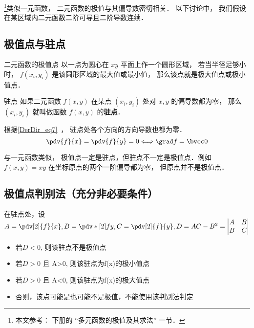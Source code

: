 

\footnote{本文参考： \cite{同济高} 下册的 “多元函数的极值及其求法” 一节．}类似一元函数， 二元函数的极值与其偏导数密切相关． 以下讨论中， 我们假设在某区域内二元函数二阶可导且二阶导数连续．

\subsection{极值点与驻点}
\begin{definition}{二元函数的极值点}
以一点为圆心在 $xy$ 平面上作一个圆形区域， 若当半径足够小时， $f(x_i, y_i)$ 是该圆形区域的最大值或最小值， 那么该点就是极大值点或极小值点． 
\end{definition}

\begin{definition}{驻点}
如果二元函数 $f(x,y)$ 在某点 $(x_i, y_i)$ 处对 $x, y$ 的偏导数都为零， 那么 $(x_i, y_i)$ 就叫做函数 $f(x,y)$ 的\textbf{驻点}． 
\end{definition}
根据\autoref{DerDir_eq7}~， 驻点处各个方向的方向导数也都为零．
\begin{equation}
\pdv{f}{x}=\pdv{f}{y}=0 \Longleftrightarrow \grad f=\bvec0
\end{equation}

与一元函数类似， 极值点一定是驻点，但驻点不一定是极值点．例如 $f(x,y) = xy$ 在坐标原点的两个一阶偏导都为零， 但原点并不是极值点． 
\subsection{极值点判别法（充分非必要条件）}
在驻点处，设$A=\pdv[2]{f}{x}, B=\pdv*[2]{f}{y}, C=\pdv[2]{f}{y}, D=AC-B^2=
\left | \begin{matrix}
A&B\\
B&C\\
\end{matrix} \right | $ 

\begin{itemize}
\item 若$D<0$, 则该驻点不是极值点
\item 若$D>0$ 且 A>0, 则该驻点为f(x)的极小值点
\item 若$D>0$ 且 A<0, 则该驻点为f(x)的极大值点
\item 否则，该点可能是也可能不是极值，不能使用该判别法判定
\end{itemize}

